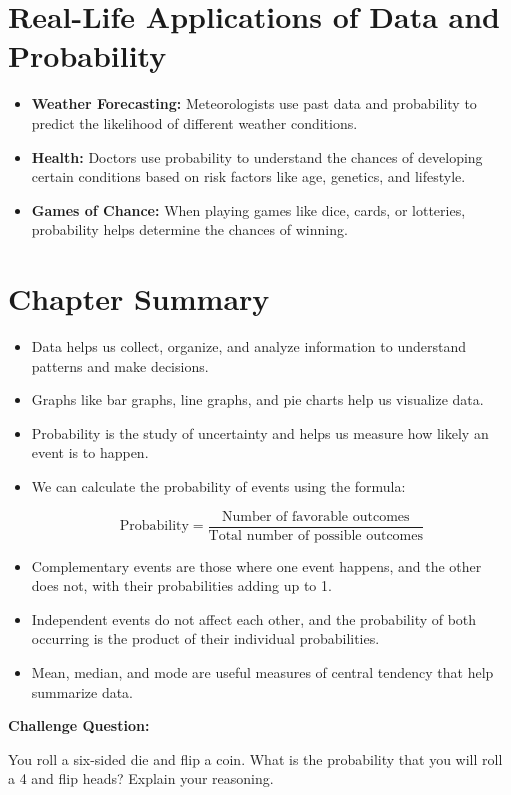 \section{Real-Life Applications of Data and Probability}
\begin{itemize}
    \item \textbf{Weather Forecasting:} Meteorologists use past data and probability to predict the likelihood of different weather conditions.
    \item \textbf{Health:} Doctors use probability to understand the chances of developing certain conditions based on risk factors like age, genetics, and lifestyle.
    \item \textbf{Games of Chance:} When playing games like dice, cards, or lotteries, probability helps determine the chances of winning.
\end{itemize}

\section{Chapter Summary}
\begin{itemize}
    \item Data helps us collect, organize, and analyze information to understand patterns and make decisions.
    \item Graphs like bar graphs, line graphs, and pie charts help us visualize data.
    \item Probability is the study of uncertainty and helps us measure how likely an event is to happen.
    \item We can calculate the probability of events using the formula: 
    
    \[
    \text{Probability} = \frac{\text{Number of favorable outcomes}}{\text{Total number of possible outcomes}}
    \]
    
    \item Complementary events are those where one event happens, and the other does not, with their probabilities adding up to 1.
    \item Independent events do not affect each other, and the probability of both occurring is the product of their individual probabilities.
    \item Mean, median, and mode are useful measures of central tendency that help summarize data.
\end{itemize}

\textbf{Challenge Question:}

You roll a six-sided die and flip a coin. What is the probability that you will roll a 4 and flip heads? Explain your reasoning.